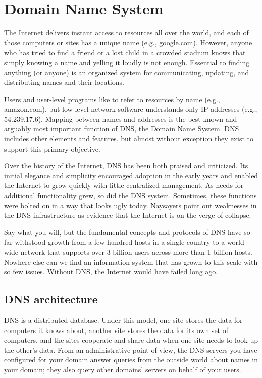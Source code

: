 \chapter{Domain Name System}
\label{chap:dns}

The Internet delivers instant access to resources all over the world,
and each of those computers or sites has a unique name (e.g.,
google.com). However, anyone who has tried to find a friend or a lost
child in a crowded stadium knows that simply knowing a name and yelling
it loudly is not enough. Essential to finding anything (or anyone) is an
organized system for communicating, updating, and distributing names and
their locations.

\protect\hypertarget{part0024_split_000.htmlux5cux23_idIndexMarker1967}{}{}Users
and user-level programs like to refer to resources by name (e.g.,
amazon.com), but low-level network software understands only IP
addresses (e.g., 54.239.17.6). Mapping between names and addresses is
the best known and arguably most important function of DNS, the Domain
Name System. DNS includes other elements and features, but almost
without exception they exist to support this primary objective.

Over the history of the Internet, DNS has been both praised and
criticized. Its initial elegance and simplicity encouraged adoption in
the early years and enabled the Internet to grow quickly with little
centralized management. As needs for additional functionality grew, so
did the DNS system. Sometimes, these functions were bolted on in a way
that looks ugly today. Naysayers point out weaknesses in the DNS
infrastructure as evidence that the Internet is on the verge of
collapse.

Say what you will, but the fundamental concepts and protocols of DNS
have so far withstood growth from a few hundred hosts in a single
country to a world-wide network that supports over 3 billion users
across more than 1 billion hosts. Nowhere else can we find an
information system that has grown to this scale with so few issues.
Without DNS, the Internet would have failed long ago.




\section{DNS architecture}

\protect\hypertarget{part0024_split_001.htmlux5cux23_idIndexMarker1968}{}{}DNS
is a distributed database. Under this model, one site stores the data
for computers it knows about, another site stores the data for its own
set of computers, and the sites cooperate and share data when one site
needs to look up the other's data. From an administrative point of view,
the DNS servers you have configured for your domain answer queries from
the outside world about names in your domain; they also query other
domains' servers on behalf of your users.



